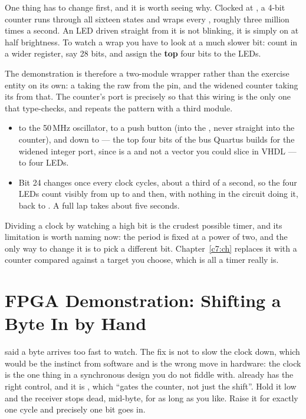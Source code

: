 One thing has to change first, and it is worth seeing why. Clocked at , a 4-bit
counter runs through all sixteen states and wraps every , roughly three million times
a second. An LED driven straight from it is not blinking, it is simply on at half brightness. To
watch a wrap you have to look at a much slower bit: count in a wider register, say 28 bits, and
assign the \textbf{top} four bits to the LEDs.

The demonstration is therefore a two-module wrapper rather than the exercise entity on its own: a
 taking the raw  from the pin, and the widened counter taking its
 from that. The counter's port is  precisely so that this wiring
is the only one that type-checks, and  repeats the pattern with a third module.
\begin{itemize}
  \item {} to the 50\,MHz oscillator,  to a push button (into the
    , never straight into the counter), and  down to
     --- the top four bits of the bus Quartus builds for the widened integer port,
    since  is a  and not a vector you could slice in VHDL --- to four
    LEDs.
  \item Bit 24 changes once every  clock cycles, about a third of a second, so the four
    LEDs count visibly from  up to  and then, with nothing in the circuit
    doing it, back to . A full lap takes about five seconds.
\end{itemize}
Dividing a clock by watching a high bit is the crudest possible timer, and its limitation is worth
naming now: the period is fixed at a power of two, and the only way to change it is to pick a
different bit. Chapter~\ref{c7:ch} replaces it with a counter compared against a target you choose,
which is all a timer really is.

\section{FPGA Demonstration: Shifting a Byte In by Hand}
\label{c6:a7}
 said a byte arrives too fast to watch. The fix is not to slow the clock down, which
would be the instinct from software and is the wrong move in hardware: the clock is the one thing
in a synchronous design you do not fiddle with.  already has the right control,
and it is , which ``gates the counter, not just the shift''. Hold it low and the
receiver stops dead, mid-byte, for as long as you like. Raise it for exactly one cycle and
precisely one bit goes in.

